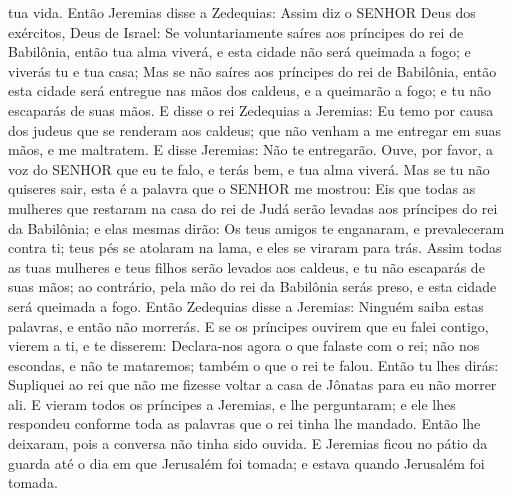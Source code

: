 {{} tua vida.
Então Jeremias disse a Zedequias: Assim diz o SENHOR Deus dos exércitos, Deus de Israel: Se voluntariamente saíres aos príncipes do rei de Babilônia, então tua alma viverá, e esta cidade não será queimada a fogo; e viverás tu e tua casa;
Mas se não saíres aos príncipes do rei de Babilônia, então esta cidade será entregue nas mãos dos caldeus, e a queimarão a fogo; e tu não escaparás de suas mãos.
E disse o rei Zedequias a Jeremias: Eu temo por causa dos judeus que se renderam aos caldeus; que não venham a me entregar em suas mãos, e me maltratem.
E disse Jeremias: Não te entregarão. Ouve, por favor, a voz do SENHOR que eu te falo, e terás bem, e tua alma viverá.
Mas se tu não quiseres sair, esta é a palavra que o SENHOR me mostrou:
Eis que todas as mulheres que restaram na casa do rei de Judá serão levadas aos príncipes do rei da Babilônia; e elas mesmas dirão: Os teus amigos te enganaram, e prevaleceram contra ti; teus pés se atolaram na lama, e eles se viraram para trás.
Assim todas as tuas mulheres e teus filhos serão levados aos caldeus, e tu não escaparás de suas mãos; ao contrário, pela mão do rei da Babilônia serás preso, e esta cidade será queimada a fogo.
Então Zedequias disse a Jeremias: Ninguém saiba estas palavras, e então não morrerás.
E se os príncipes ouvirem que eu falei contigo, vierem a ti, e te disserem: Declara-nos agora o que falaste com o rei; não nos escondas, e não te mataremos;
{} também o que o rei te falou.
Então tu lhes dirás: Supliquei ao rei que não me fizesse voltar a casa de Jônatas para eu não morrer ali.
E
{} vieram todos os príncipes a Jeremias, e lhe perguntaram; e ele lhes respondeu conforme toda as palavras que o rei tinha lhe mandado. Então lhe deixaram, pois a conversa não tinha sido ouvida.
E Jeremias ficou no pátio da guarda até o dia em que Jerusalém foi tomada; e
{} estava quando Jerusalém foi tomada.

\par }

